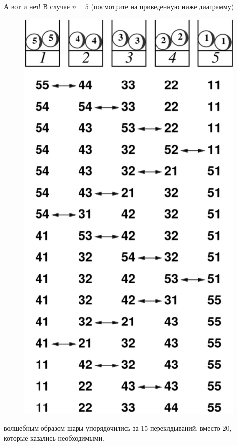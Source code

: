 А вот и нет!
В случае $n = 5$ (посмотрите на приведенную ниже диаграмму)
\begin{figure}[h!]
\centering
\includegraphics[scale=0.5]{Figs/UnsolvedPuzzles/5bin}
\end{figure}
волшебным образом шары упорядочились за 15 переклдываний, вместо 20, которые казались необходимыми.

